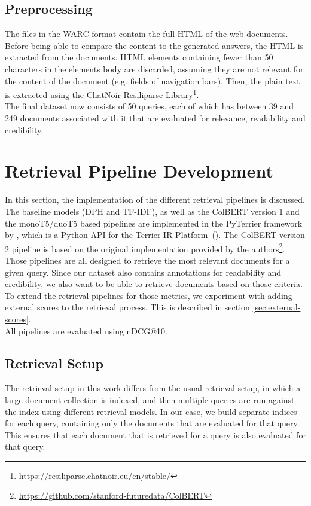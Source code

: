 \subsection{Preprocessing}
The files in the WARC format contain the full HTML of the web documents.
Before being able to compare the content to the generated answers, the HTML is extracted from the documents.
HTML elements containing fewer than 50 characters in the elements body are discarded, assuming they are not relevant for the content of the document (e.g. fields of navigation bars).
Then, the plain text is extracted using the ChatNoir Resiliparse Library\footnote{\url{https://resiliparse.chatnoir.eu/en/stable/}}.
\\
The final dataset now consists of 50 queries, each of which has between 39 and 249 documents associated with it that are evaluated for relevance, readability and credibility.


\section{Retrieval Pipeline Development}
In this section, the implementation of the different retrieval pipelines is discussed.
The baseline models (DPH and TF-IDF), as well as the ColBERT version 1 and the monoT5/duoT5 based pipelines are implemented in the PyTerrier framework by \cite{pyterrier:2020}, which is a Python API for the Terrier IR Platform~(\cite{macdonald:2012}).
The ColBERT version 2 pipeline is based on the original implementation provided by the authors\footnote{\url{https://github.com/stanford-futuredata/ColBERT}}.
\\
Those pipelines are all designed to retrieve the most relevant documents for a given query.
Since our dataset also contains annotations for readability and credibility, we also want to be able to retrieve documents based on those criteria.
To extend the retrieval pipelines for those metrics, we experiment with adding external scores to the retrieval process.
This is described in section \ref{sec:external-scores}.
\\
All pipelines are evaluated using nDCG@10. %

\subsection{Retrieval Setup}
The retrieval setup in this work differs from the usual retrieval setup, in which a large document collection is indexed, and then multiple queries are run against the index using different retrieval models.
In our case, we build separate indices for each query, containing only the documents that are evaluated for that query.
This ensures that each document that is retrieved for a query is also evaluated for that query.

